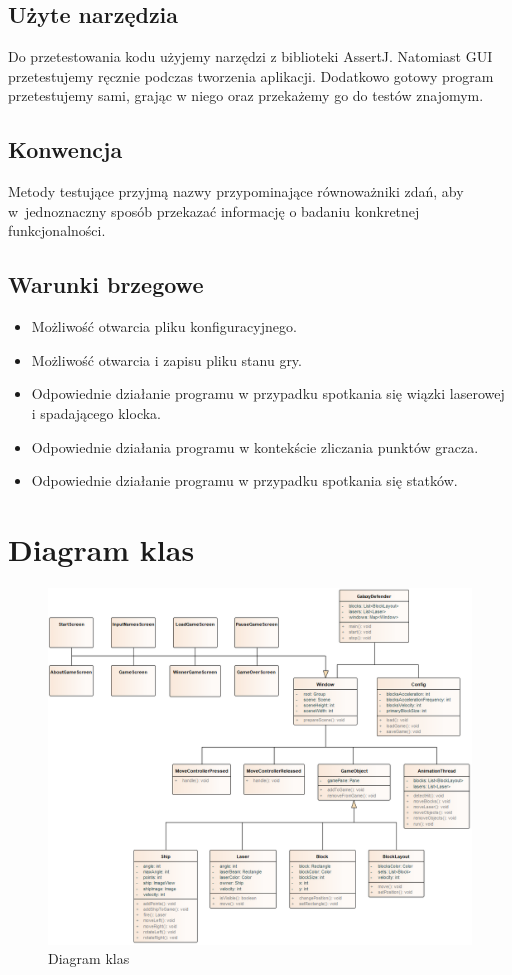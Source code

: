 \documentclass[a4paper]{article}
\begin{document}
\subsection{Użyte narzędzia}
Do przetestowania kodu użyjemy narzędzi z biblioteki AssertJ. Natomiast GUI przetestujemy ręcznie podczas tworzenia aplikacji. Dodatkowo gotowy program przetestujemy sami, grając w niego oraz przekażemy go do testów znajomym.

\subsection{Konwencja}
Metody testujące przyjmą nazwy przypominające równoważniki zdań, aby w~jednoznaczny sposób przekazać informację o badaniu konkretnej funkcjonalności.

\newpage

\subsection{Warunki brzegowe}
\begin{itemize}
    \item Możliwość otwarcia pliku konfiguracyjnego.
    \item Możliwość otwarcia i zapisu pliku stanu gry.
    \item Odpowiednie działanie programu w przypadku spotkania się wiązki laserowej i spadającego klocka.
    \item Odpowiednie działania programu w kontekście zliczania punktów gracza.
    \item Odpowiednie działanie programu w przypadku spotkania się statków.
\end{itemize}

\section{Diagram klas}
\begin{figure}[H]
    \centering
    \includegraphics[width=\textwidth]{img/diagram-klas.png}
    \caption{Diagram klas}
    \label{fig:diagram}
\end{figure}
\label{end}
\end{document}
